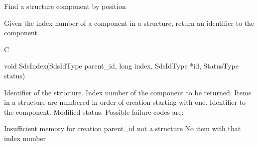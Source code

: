\begin{manroutinedescription}
      Find a structure component by position

      Given the index number of a component in a structure, return an
      identifier to the component.
 
      C

      void SdsIndex(SdsIdType parent\_{}id, long index, SdsIdType *id,
             StatusType {\mantt{*}} {} status)
 
\begin{manparametertable}
 Identifier of the %
structure.
  Index number of the component to %
be returned.
                            Items in a structure are numbered in order of
                            creation starting with one.
 Identifier to the component.
 Modified status. Possible %
failure codes are:
\end{manparametertable}
\begin{mantwocolumntable}
Insufficient memory for creation
parent\_{}id not a structure
No item with that index number
\end{mantwocolumntable}
\end{manroutinedescription}
